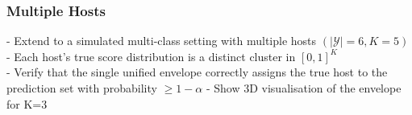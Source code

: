 \subsubsection{Multiple Hosts}
\noindent - Extend to a simulated multi-class setting with multiple hosts $(|\mathcal{Y}| = 6, K=5)$\\
- Each host's true score distribution is a distinct cluster in $[0,1]^K$\\
- Verify that the single unified envelope correctly assigns the true host to the prediction set with probability $\geq 1-\alpha$
- Show 3D visualisation of the envelope for K=3
